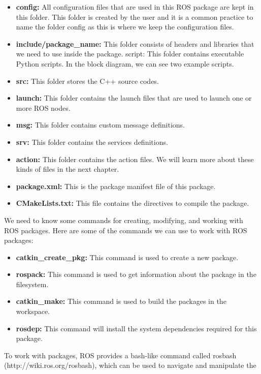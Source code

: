 \documentclass[../../main]{subfiles}
\begin{document}
\begin{itemize}
    \item \textbf{config:} All configuration files that are used in this ROS package are kept in this
    folder. This folder is created by the user and it is a common practice to name the
    folder config as this is where we keep the configuration files.
    \item \textbf{include/package\_name:} This folder consists of headers and libraries that we
    need to use inside the package.
    script: This folder contains executable Python scripts. In the block diagram, we
can see two example scripts.
\item \textbf{src:} This folder stores the C++ source codes.
\item \textbf{launch:} This folder contains the launch files that are used to launch one or more
ROS nodes.
\item \textbf{msg:} This folder contains custom message definitions.
\item \textbf{srv:} This folder contains the services definitions.
\item \textbf{action:} This folder contains the action files. We will learn more about these kinds
of files in the next chapter.
\item \textbf{package.xml:} This is the package manifest file of this package.
\item \textbf{CMakeLists.txt:} This file contains the directives to compile the package.
    
\end{itemize}
We need to know some commands for creating, modifying, and working with ROS
packages. Here are some of the commands we can use to work with ROS packages:
\begin{itemize}
\item \textbf{catkin\_create\_pkg:} This command is used to create a new package.
\item \textbf{rospack:} This command is used to get information about the package in the
filesystem.
\item \textbf{catkin\_make:} This command is used to build the packages in the workspace.
\item \textbf{rosdep:} This command will install the system dependencies required for this
package.
\end{itemize}
To work with packages, ROS provides a bash-like command called rosbash \\
(http://wiki.ros.org/rosbash), which can be used to navigate and manipulate the
\end{document}
